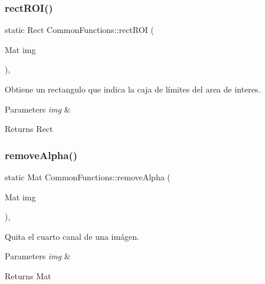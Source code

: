 \subsubsection{\texorpdfstring{rect\+R\+O\+I()}{rectROI()}}
{\footnotesize\ttfamily static Rect Common\+Functions\+::rect\+R\+OI (\begin{DoxyParamCaption}\item[{Mat}]{img }\end{DoxyParamCaption})\hspace{0.3cm}{\ttfamily [inline]}, {\ttfamily [static]}}



Obtiene un rectangulo que indica la caja de límites del area de interes. 


\begin{DoxyParams}{Parameters}
{\em img} & \\
\hline
\end{DoxyParams}
\begin{DoxyReturn}{Returns}
Rect 
\end{DoxyReturn}
\mbox{\label{classCommonFunctions_a511266d1137ccdefb6e7c5d156145831}} 
\subsubsection{\texorpdfstring{remove\+Alpha()}{removeAlpha()}}
{\footnotesize\ttfamily static Mat Common\+Functions\+::remove\+Alpha (\begin{DoxyParamCaption}\item[{Mat}]{img }\end{DoxyParamCaption})\hspace{0.3cm}{\ttfamily [inline]}, {\ttfamily [static]}}



Quita el cuarto canal de una imágen. 


\begin{DoxyParams}{Parameters}
{\em img} & \\
\hline
\end{DoxyParams}
\begin{DoxyReturn}{Returns}
Mat 
\end{DoxyReturn}
\mbox{\label{classCommonFunctions_a5393a67a9e631a763fe5874174e386d0}} 
